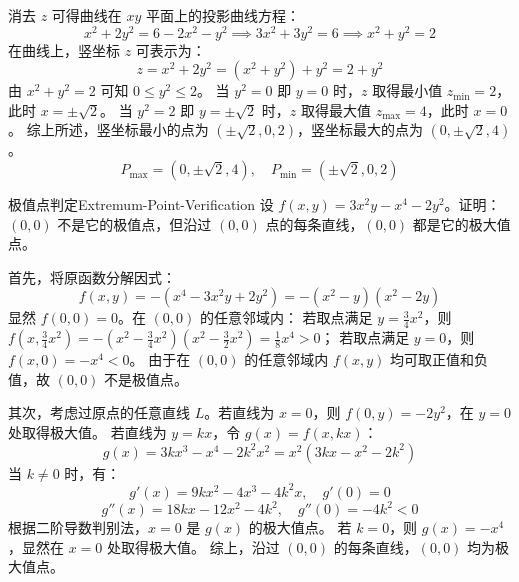 \begin{solution}
    消去 $z$ 可得曲线在 $xy$ 平面上的投影曲线方程：
    \begin{equation}
        x^2 + 2y^2 = 6 - 2x^2 - y^2 \implies 3x^2 + 3y^2 = 6 \implies x^2 + y^2 = 2
    \end{equation}
    在曲线上，竖坐标 $z$ 可表示为：
    \begin{equation}
        z = x^2 + 2y^2 = (x^2 + y^2) + y^2 = 2 + y^2
    \end{equation}
    由 $x^2 + y^2 = 2$ 可知 $0 \le y^2 \le 2$。
    当 $y^2 = 0$ 即 $y = 0$ 时，$z$ 取得最小值 $z_{\min} = 2$，此时 $x = \pm\sqrt{2}$。
    当 $y^2 = 2$ 即 $y = \pm\sqrt{2}$ 时，$z$ 取得最大值 $z_{\max} = 4$，此时 $x = 0$。
    综上所述，竖坐标最小的点为 $(\pm\sqrt{2}, 0, 2)$，竖坐标最大的点为 $(0, \pm\sqrt{2}, 4)$。
    \begin{equation}
        \boxed{P_{\max} = (0, \pm\sqrt{2}, 4), \quad P_{\min} = (\pm\sqrt{2}, 0, 2)}
    \end{equation}
\end{solution}

\begin{problem}{极值点判定}{Extremum-Point-Verification}
    设 $f(x, y) = 3x^2y - x^4 - 2y^2$。证明：$(0, 0)$ 不是它的极值点，但沿过 $(0, 0)$ 点的每条直线，$(0, 0)$ 都是它的极大值点。
\end{problem}

\begin{myproof}
    首先，将原函数分解因式：
    \begin{equation}
        f(x, y) = -(x^4 - 3x^2y + 2y^2) = -(x^2 - y)(x^2 - 2y)
    \end{equation}
    显然 $f(0, 0) = 0$。在 $(0, 0)$ 的任意邻域内：
    若取点满足 $y = \frac{3}{4}x^2$，则 $f(x, \frac{3}{4}x^2) = -(x^2 - \frac{3}{4}x^2)(x^2 - \frac{3}{2}x^2) = \frac{1}{8}x^4 > 0$；
    若取点满足 $y = 0$，则 $f(x, 0) = -x^4 < 0$。
    由于在 $(0, 0)$ 的任意邻域内 $f(x, y)$ 均可取正值和负值，故 $(0, 0)$ 不是极值点。

    其次，考虑过原点的任意直线 $L$。若直线为 $x = 0$，则 $f(0, y) = -2y^2$，在 $y = 0$ 处取得极大值。
    若直线为 $y = kx$，令 $g(x) = f(x, kx)$：
    \begin{equation}
        g(x) = 3kx^3 - x^4 - 2k^2x^2 = x^2(3kx - x^2 - 2k^2)
    \end{equation}
    当 $k \neq 0$ 时，有：
    \begin{equation}
        g'(x) = 9kx^2 - 4x^3 - 4k^2x, \quad g'(0) = 0
    \end{equation}
    \begin{equation}
        g''(x) = 18kx - 12x^2 - 4k^2, \quad g''(0) = -4k^2 < 0
    \end{equation}
    根据二阶导数判别法，$x = 0$ 是 $g(x)$ 的极大值点。
    若 $k = 0$，则 $g(x) = -x^4$，显然在 $x = 0$ 处取得极大值。
    综上，沿过 $(0, 0)$ 的每条直线，$(0, 0)$ 均为极大值点。
\end{myproof}


